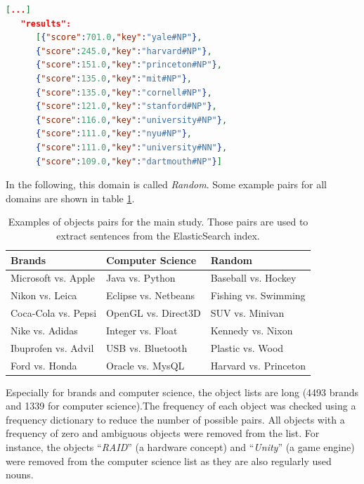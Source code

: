 \begin{minipage}{\linewidth}

\begin{lstlisting}[language=json,label=lst:jbtres,caption=JoBimTexts response. Shows similar words to \emph{\enquote{Yale}}. Those objects can be compared meaningful.]
[...]
   "results":
      [{"score":701.0,"key":"yale#NP"},
      {"score":245.0,"key":"harvard#NP"},
      {"score":151.0,"key":"princeton#NP"},
      {"score":135.0,"key":"mit#NP"},
      {"score":135.0,"key":"cornell#NP"},
      {"score":121.0,"key":"stanford#NP"},
      {"score":116.0,"key":"university#NP"},
      {"score":111.0,"key":"nyu#NP"},
      {"score":111.0,"key":"university#NN"},
      {"score":109.0,"key":"dartmouth#NP"}]
\end{lstlisting}
\end{minipage}
In the following, this domain is called \emph{Random}. Some example pairs for all domains are shown in table \ref{tbl:exp_pairs}.
\begin{table}[h]
\centering
\caption{Examples of objects pairs for the main study. Those pairs are used to extract sentences from the ElasticSearch index.}
\label{tbl:exp_pairs}

\begin{tabularx}{\textwidth}{XXX}
\toprule
Brands & Computer Science & Random \\
\midrule
Microsoft vs. Apple & Java vs. Python & Baseball vs. Hockey \\
Nikon vs. Leica & Eclipse vs. Netbeans & Fishing vs. Swimming\\
Coca-Cola vs. Pepsi & OpenGL vs. Direct3D & SUV vs. Minivan\\
Nike vs. Adidas & Integer vs. Float & Kennedy vs. Nixon\\
Ibuprofen vs. Advil & USB vs. Bluetooth & Plastic vs. Wood\\
Ford vs. Honda & Oracle vs. MysQL & Harvard vs. Princeton\\

\bottomrule

\end{tabularx}

\end{table}

Especially for brands and computer science, the object lists are long (4493 brands and 1339 for computer science).The frequency of each object was checked using a frequency dictionary to reduce the number of possible pairs. All objects with a frequency of zero and ambiguous objects were removed from the list. For instance, the objects \enquote{\emph{RAID}} (a hardware concept) and \enquote{\emph{Unity}}  (a game engine) were removed from the computer science list as they are also regularly used nouns.

